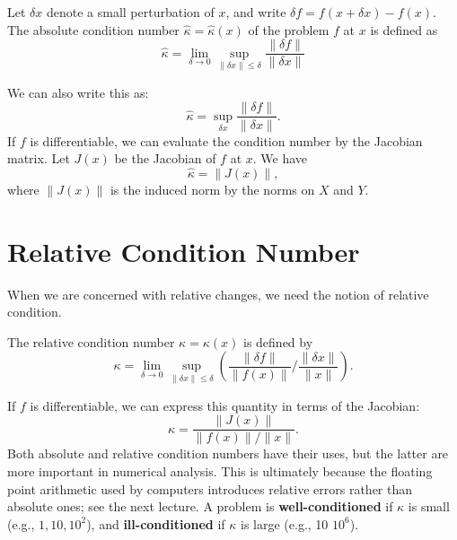 \begin{definition}
\label{def: Absolute condition number}
Let $\delta x$ denote a small perturbation of $x$, and write $\delta f=f(x+\delta x)-f(x)$. The absolute condition number $\hat{\kappa}=\hat{\kappa}(x)$ of the problem $f$ at $x$ is defined as
$$
\hat{\kappa}=\lim _{\delta \rightarrow 0} \sup _{\|\delta x\| \leq \delta} \frac{\|\delta f\|}{\|\delta x\|}
$$
\end{definition}
We can also write this as: 
\[
    \hat{\kappa}=\sup _{\delta x} \frac{\|\delta f\|}{\|\delta x\|}. 
\]
If $f$ is differentiable, we can evaluate the condition number by the Jacobian matrix. Let $J(x)$ be the Jacobian of $f$ at $x$. We have 
\[
    \hat \kappa = \|J(x)\|, 
\]
where $\|J(x)\|$ is the induced norm by the norms on $X$ and $Y$. 

\section{Relative Condition Number} 
When we are concerned with relative changes, we need the notion of relative condition.  


\begin{definition}
\label{def: Relative condition number}
The relative condition number $\kappa=\kappa(x)$ is defined by
$$
\kappa=\lim _{\delta \rightarrow 0} \sup _{\|\delta x\| \leq \delta}\left(\frac{\|\delta f\|}{\|f(x)\|} / \frac{\|\delta x\|}{\|x\|}\right). 
$$
\end{definition}
If $f$ is differentiable, we can express this quantity in terms of the Jacobian: 
\[
    \kappa=\frac{\|J(x)\|}{\|f(x)\| /\|x\|}. 
\]
Both absolute and relative condition numbers have their uses, but the latter are more important in numerical analysis. This is ultimately because the floating point arithmetic used by computers introduces relative errors rather than absolute ones; see the next lecture. A problem is \textbf{well-conditioned} if $\kappa$ is small (e.g., $1,10,10^2$), and \textbf{ill-conditioned} if $\kappa$ is large (e.g., 10 $10^6$).

